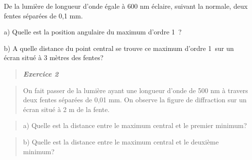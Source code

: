 De la lumière de longueur d'onde égale à 600 nm éclaire, suivant la
normale, deux fentes séparées de 0,1 mm.

a) Quelle est la position angulaire du maximum d'ordre 1~?

b) A quelle distance du point central se trouve ce maximum d'ordre 1~sur
un écran situé à 3 mètres des fentes?

\begin{quote}
\emph{\textbf{Exercice 2}}
\end{quote}

\begin{quote}
\end{quote}

\begin{quote}
On fait passer de la lumière ayant une longueur d'onde de 500 nm à
travers deux fentes séparées de 0,01 mm. On observe la figure de
diffraction sur un écran situé à 2 m de la fente.
\end{quote}

\begin{quote}
\end{quote}

\begin{quote}
a) Quelle est la distance entre le maximum central et le premier
minimum?
\end{quote}

\begin{quote}
\end{quote}

\begin{quote}
\end{quote}

\begin{quote}
\end{quote}

\begin{quote}
\end{quote}

\begin{quote}
\end{quote}

\begin{quote}
b) Quelle est la distance entre le maximum central et le deuxième
minimum?
\end{quote}

\begin{quote}
\end{quote}

\begin{quote}
\end{quote}

